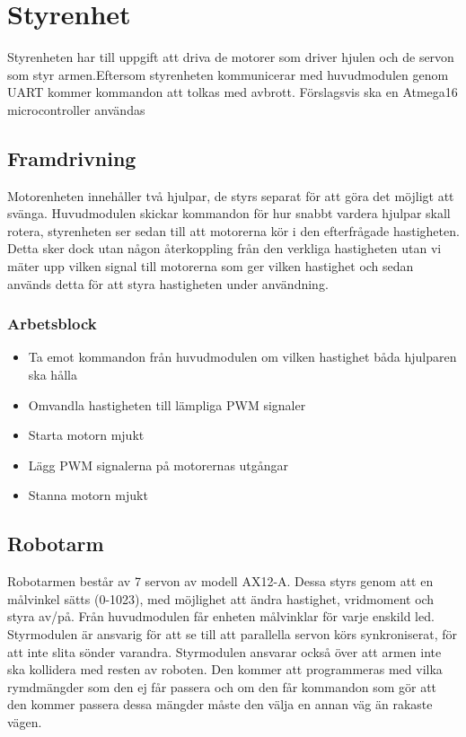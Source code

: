 
\section{Styrenhet}

Styrenheten har till uppgift att driva de motorer som driver hjulen och de servon som styr armen.Eftersom styrenheten kommunicerar med huvudmodulen genom UART kommer kommandon att tolkas med avbrott. Förslagsvis ska en Atmega16 microcontroller användas

\subsection{Framdrivning}

Motorenheten innehåller två hjulpar, de styrs separat för att göra det möjligt att svänga. Huvudmodulen skickar kommandon för hur snabbt vardera hjulpar skall rotera, styrenheten ser sedan till att motorerna kör i den efterfrågade hastigheten. Detta sker dock utan någon återkoppling från den verkliga hastigheten utan vi mäter upp vilken signal till motorerna som ger vilken hastighet och sedan används detta för att styra hastigheten under användning.

\subsubsection{Arbetsblock}
\begin{itemize}
\item Ta emot kommandon från huvudmodulen om vilken hastighet båda hjulparen ska hålla
\item Omvandla hastigheten till lämpliga PWM signaler
\item Starta motorn mjukt
\item Lägg PWM signalerna på motorernas utgångar
\item Stanna motorn mjukt
\end{itemize}

\subsection{Robotarm}

Robotarmen består av 7 servon av modell AX12-A. Dessa styrs genom att en målvinkel sätts (0-1023), med möjlighet att ändra hastighet, vridmoment och styra av/på. Från huvudmodulen får enheten målvinklar för varje enskild led. Styrmodulen är ansvarig för att se till att parallella servon körs synkroniserat, för att inte slita sönder varandra. Styrmodulen ansvarar också över att armen inte ska kollidera med resten av roboten. Den kommer att programmeras med vilka rymdmängder som den ej får passera och om den får kommandon som gör att den kommer passera dessa mängder måste den välja en annan väg än rakaste vägen.

